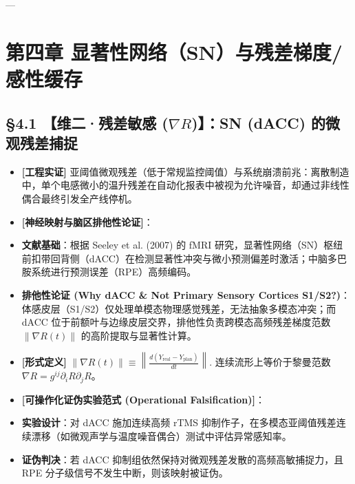 \documentclass[11pt,a4paper,oneside]{ctexart}
\begin{document}
---


\section{第四章 显著性网络（SN）与残差梯度/感性缓存}

\subsection{§4.1 【维二·残差敏感 (\texorpdfstring{$\nabla R$}{nabla R})】：SN (dACC) 的微观残差捕捉}

\begin{itemize}\item \textbf{[工程实证]} 亚阈值微观残差（低于常规监控阈值）与系统崩溃前兆：离散制造中，单个电感微小的温升残差在自动化报表中被视为允许噪音，却通过非线性偶合最终引发全产线停机。\end{itemize}
\begin{itemize}\item \textbf{[神经映射与脑区排他性论证]}：\end{itemize}
\begin{itemize}\item \textbf{文献基础}：根据 Seeley et al. (2007) 的 fMRI 研究，显著性网络（SN）枢纽前扣带回背侧（dACC）在检测显著性冲突与微小预测偏差时激活；中脑多巴胺系统进行预测误差（RPE）高频编码。\end{itemize}
\begin{itemize}\item \textbf{排他性论证 (Why dACC \& Not Primary Sensory Cortices S1/S2?)}：体感皮层（S1/S2）仅处理单模态物理感觉残差，无法抽象多模态冲突；而 dACC 位于前额叶与边缘皮层交界，排他性负责\textit{}跨模态高频残差梯度范数 $\|\nabla R(t)\|$ 的高阶提取与显著性计算\textit{}。\end{itemize}
\begin{itemize}\item \textbf{[形式定义]} $\|\nabla R(t)\| \equiv \left\| \frac{d (Y_{\text{real}} - Y_{\text{plan}})}{dt} \right\|.$ 连续流形上等价于黎曼范数 $\nabla R = g^{ij} \partial_i R \partial_j R$。\end{itemize}
\begin{itemize}\item \textbf{[可操作化证伪实验范式 (Operational Falsification)]}：\end{itemize}
\begin{itemize}\item \textbf{实验设计}：对 dACC 施加连续高频 rTMS 抑制作子，在多模态亚阈值残差连续漂移（如微观声学与温度噪音偶合）测试中评估异常感知率。\end{itemize}
\begin{itemize}\item \textbf{证伪判决}：若 dACC 抑制组依然保持对微观残差发散的高频高敏捕捉力，且 RPE 分子级信号不发生中断，则该映射被证伪。\end{itemize}
\end{document}

